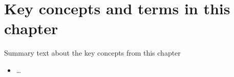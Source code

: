 \documentclass[springer.tex]{subfiles}
\begin{document}


\section{Key concepts and terms in this chapter}
Summary text about the key concepts from this chapter
\begin{itemize}
\item \ldots
\end{itemize}
\end{document}
